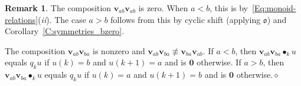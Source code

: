 \documentclass[12pt,oneside,reqno]{amsart}
\theoremstyle{definition}
\newtheorem{remark}[theorem]{Remark}
\numberwithin{equation}{section}
\newcommand{\qv}{{\mathbf v}}
\newcommand{\bzero}{{\mathbf 0}}
\DeclareMathOperator{\kactionop}{{\scriptstyle \bullet}}
\newcommand{\kaction}[1][k]{\kactionop_{#1}}
\newcommand{\ncycle}{\mathfrak o}
\begin{document}
\begin{remark}
  The composition $\qv_{ab}\qv_{ab}$ is zero.
  When $a<b$, this is by~\eqref{Eq:monoid-relations}({\it ii}).  The case $a>b$ follows from this by cyclic shift (applying $\ncycle$) and 
  Corollary~\ref{C:symmetries_bzero}.

  The composition $\qv_{ab}\qv_{ba}$ is nonzero and $\qv_{ab}\qv_{ba}\not\equiv \qv_{ba}\qv_{ab}$.
  If $a<b$, then $\qv_{ab}\qv_{ba}\kaction u$ equals $q_k u$ if $u(k)=b$ and $u(k{+}1)=a$ and is $\bzero$ otherwise.
  If $a>b$, then $\qv_{ab}\qv_{ba}\kaction u$ equals $q_k u$ if $u(k)=a$ and $u(k{+}1)=b$ and is $\bzero$ otherwise.\hfill$\diamond$
\end{remark}
\end{document}
